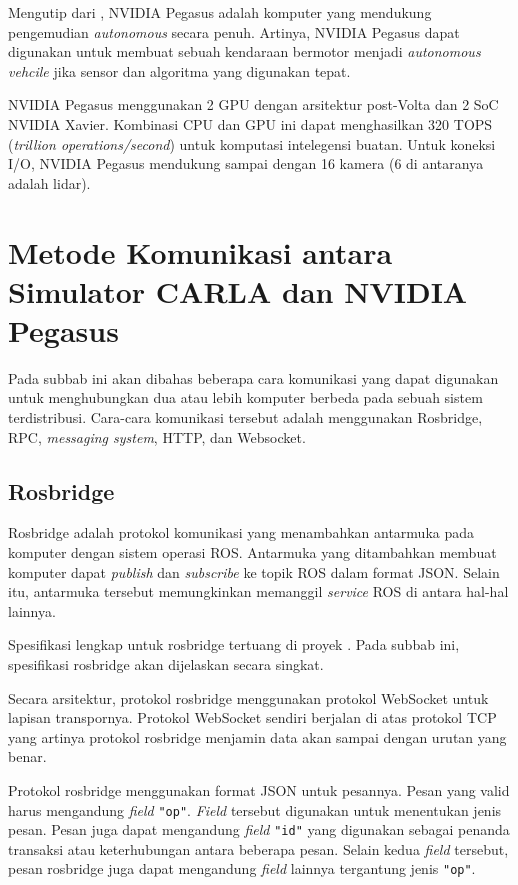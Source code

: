 Mengutip dari \parencite{oh_2017}, NVIDIA Pegasus adalah komputer yang
mendukung pengemudian \textit{autonomous} secara penuh. Artinya, NVIDIA Pegasus
dapat digunakan untuk membuat sebuah kendaraan bermotor menjadi
\textit{autonomous vehcile} jika sensor dan algoritma yang digunakan tepat.

NVIDIA Pegasus menggunakan 2 GPU dengan arsitektur post-Volta dan 2 SoC NVIDIA
Xavier. Kombinasi CPU dan GPU ini dapat menghasilkan 320 TOPS (\textit{trillion
      operations/second}) untuk komputasi intelegensi buatan. Untuk koneksi I/O,
NVIDIA Pegasus mendukung sampai dengan 16 kamera (6 di antaranya adalah lidar).


\section{Metode Komunikasi antara Simulator CARLA dan NVIDIA Pegasus}

Pada subbab ini akan dibahas beberapa cara komunikasi yang dapat digunakan
untuk menghubungkan dua atau lebih komputer berbeda pada sebuah sistem
terdistribusi. Cara-cara komunikasi tersebut adalah menggunakan Rosbridge, RPC,
\textit{messaging system}, HTTP, dan Websocket.

\subsection{Rosbridge}

Rosbridge adalah protokol komunikasi yang menambahkan antarmuka pada komputer
dengan sistem operasi ROS. Antarmuka yang ditambahkan membuat komputer dapat
\textit{publish} dan \textit{subscribe} ke topik ROS dalam format JSON. Selain
itu, antarmuka tersebut memungkinkan memanggil \textit{service} ROS di antara
hal-hal lainnya.

Spesifikasi lengkap untuk rosbridge tertuang di proyek \parencite{ros_bridge}.
Pada subbab ini, spesifikasi rosbridge akan dijelaskan secara singkat.

Secara arsitektur, protokol rosbridge menggunakan protokol WebSocket untuk
lapisan transpornya. Protokol WebSocket sendiri berjalan di atas protokol TCP
yang artinya protokol rosbridge menjamin data akan sampai dengan urutan yang
benar.

Protokol rosbridge menggunakan format JSON untuk pesannya. Pesan yang valid
harus mengandung \textit{field} \texttt{"op"}. \textit{Field} tersebut digunakan
untuk menentukan jenis pesan. Pesan juga dapat mengandung \textit{field}
\texttt{"id"} yang digunakan sebagai penanda transaksi atau keterhubungan antara
beberapa pesan. Selain kedua \textit{field} tersebut, pesan rosbridge juga dapat
mengandung \textit{field} lainnya tergantung jenis \texttt{"op"}.

